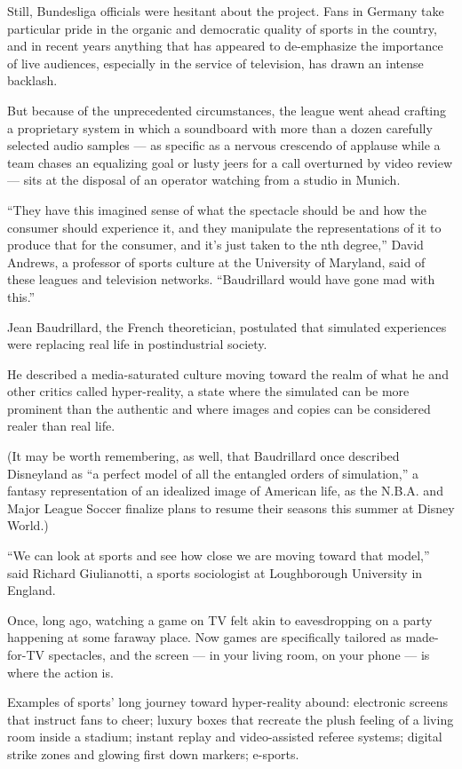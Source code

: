 Still, Bundesliga officials were hesitant about the project. Fans in
Germany take particular pride in the organic and democratic quality of
sports in the country, and in recent years anything that has appeared to
de-emphasize the importance of live audiences, especially in the service
of television, has drawn an intense backlash.

But because of the unprecedented circumstances, the league went ahead
crafting a proprietary system in which a soundboard with more than a
dozen carefully selected audio samples --- as specific as a nervous
crescendo of applause while a team chases an equalizing goal or lusty
jeers for a call overturned by video review --- sits at the disposal of
an operator watching from a studio in Munich.

``They have this imagined sense of what the spectacle should be and how
the consumer should experience it, and they manipulate the
representations of it to produce that for the consumer, and it's just
taken to the nth degree,'' David Andrews, a professor of sports culture
at the University of Maryland, said of these leagues and television
networks. ``Baudrillard would have gone mad with this.''

Jean Baudrillard, the French theoretician, postulated that simulated
experiences were replacing real life in postindustrial society.

He described a media-saturated culture moving toward the realm of what
he and other critics called hyper-reality, a state where the simulated
can be more prominent than the authentic and where images and copies can
be considered realer than real life.

(It may be worth remembering, as well, that Baudrillard once described
Disneyland as ``a perfect model of all the entangled orders of
simulation,'' a fantasy representation of an idealized image of American
life, as the N.B.A. and Major League Soccer finalize plans to resume
their seasons this summer at Disney World.)

``We can look at sports and see how close we are moving toward that
model,'' said Richard Giulianotti, a sports sociologist at Loughborough
University in England.

Once, long ago, watching a game on TV felt akin to eavesdropping on a
party happening at some faraway place. Now games are specifically
tailored as made-for-TV spectacles, and the screen --- in your living
room, on your phone --- is where the action is.

Examples of sports' long journey toward hyper-reality abound: electronic
screens that instruct fans to cheer; luxury boxes that recreate the
plush feeling of a living room inside a stadium; instant replay and
video-assisted referee systems; digital strike zones and glowing first
down markers; e-sports.

